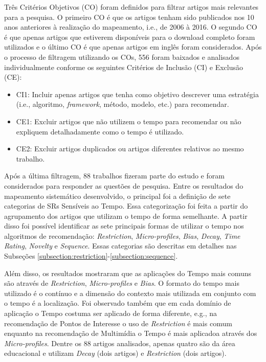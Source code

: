 Três Critérios Objetivos (CO) foram definidos para filtrar artigos mais relevantes para a pesquisa. O primeiro CO é que os
artigos tenham sido publicados nos 10 anos anteriores à realização do mapeamento, i.e., de 2006 à 2016. O segundo CO é
que apenas artigos que estiverem disponíveis para o download completo foram utilizados e o último CO é que apenas artigos
em inglês foram considerados. Após o processo de filtragem utilizando os COs, 556 foram baixados e analisados individualmente
conforme os seguintes Critérios de Inclusão (CI) e Exclusão (CE):

\begin{itemize}
\item CI1: Incluir apenas artigos que tenha como objetivo descrever uma estratégia (i.e., algoritmo, \textit{framework},
método, modelo, etc.) para recomendar.
\item CE1: Excluir artigos que não utilizem o tempo para recomendar ou não expliquem detalhadamente como o tempo é utilizado.
\item CE2: Excluir artigos duplicados ou artigos diferentes relativos ao mesmo trabalho.
\end{itemize}

Após a última filtragem, 88 trabalhos fizeram parte do estudo e foram considerados para responder as
questões de pesquisa. Entre os resultados do mapeamento sistemático desenvolvido, o principal
foi a definição de sete categorias de SRs Sensíveis ao Tempo. Essa categorização foi feita a partir do agrupamento
dos artigos que utilizam o tempo de forma semelhante. A partir disso foi possível identificar as sete principais
formas de utilizar o tempo nos algoritmos de recomendação: \textit{Restriction}, \textit{Micro-profiles}, \textit{Bias},
\textit{Decay}, \textit{Time Rating}, \textit{Novelty} e \textit{Sequence}. Essas categorias são descritas em detalhes
nas Subseções \ref{subsection:restriction}-\ref{subsection:sequence}.

Além disso, os resultados mostraram que as aplicações do Tempo mais comuns são através de \textit{Restriction},
\textit{Micro-profiles} e \textit{Bias}. O formato do tempo mais utilizado é o contínuo e a dimensão do contexto mais
utilizada em conjunto com o tempo é a localização. Foi observado também que em cada domínio de aplicação o Tempo costuma ser
aplicado de forma diferente, e.g., na recomendação de Pontos de Interesse o uso de \textit{Restriction} é mais comum enquanto
na recomendação de Multimídia o Tempo é mais aplicadoa através dos \textit{Micro-profiles}. Dentre os 88 artigos analisados,
apenas quatro são da área educacional e utilizam \textit{Decay} (dois artigos) e \textit{Restriction} (dois artigos).

